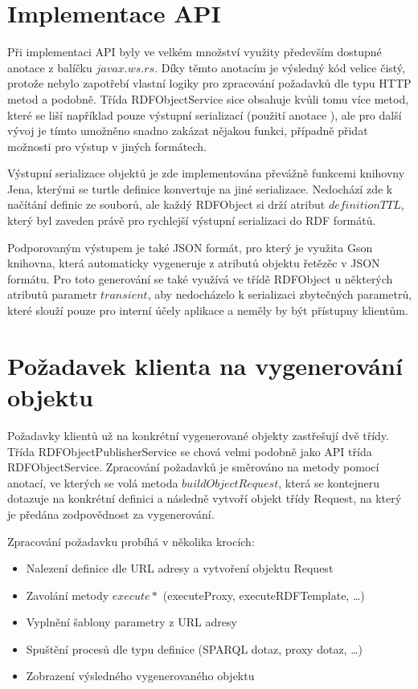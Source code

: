 \documentclass[thesis=B,czech]{FITthesis}[2012/06/26]
\begin{document}
  
  \section{Implementace API}
  Při implementaci API byly ve velkém množství využity především dostupné anotace z balíčku $javax.ws.rs$. Díky těmto anotacím je výsledný kód velice čistý, protože
  nebylo zapotřebí vlastní logiky pro zpracování požadavků dle typu HTTP metod a podobně. Třída RDFObjectService sice obsahuje kvůli tomu více metod, které se liší
  například pouze výstupní serializací (použití anotace ), ale pro další vývoj je tímto umožněno snadno zakázat nějakou funkci, případně přidat možnosti pro 
  výstup v jiných formátech.
  
  Výstupní serializace objektů je zde implementována převážně funkcemi knihovny Jena, kterými se turtle definice konvertuje na jiné serializace.
  Nedochází zde k načítání definic ze souborů, ale každý RDFObject si drží atribut $definitionTTL$, který byl zaveden právě pro rychlejší výstupní serializaci do 
  RDF formátů. 
  
  Podporovaným výstupem je také JSON formát, pro který je využita Gson knihovna, která automaticky vygeneruje z atributů objektu řetězěc v JSON
  formátu. Pro toto generování se také využívá ve třídě RDFObject u některých atributů parametr $transient$, aby nedocházelo k serializaci zbytečných parametrů,
  které slouží pouze pro interní účely aplikace a neměly by být přístupny klientům.
  
  \section{Požadavek klienta na vygenerování objektu}
  Požadavky klientů už na konkrétní vygenerované objekty zastřešují dvě třídy. Třída RDFObjectPublisherService se chová velmi podobně jako API třída RDFObjectService.
  Zpracování požadavků je směrováno na metody pomocí anotací, ve kterých se volá metoda $buildObjectRequest$, která se kontejneru dotazuje na konkrétní definici
  a následně vytvoří objekt třídy Request, na který je předána zodpovědnost za vygenerování.
  
  Zpracování požadavku probíhá v několika krocích:
  \begin{itemize}
   \item Nalezení definice dle URL adresy a vytvoření objektu Request
   \item Zavolání metody $execute*$ (executeProxy, executeRDFTemplate, \ldots)
   \item Vyplnění šablony parametry z URL adresy
   \item Spuštění procesů dle typu definice (SPARQL dotaz, proxy dotaz, \ldots)
   \item Zobrazení výsledného vygenerovaného objektu
  \end{itemize}
\end{document}
